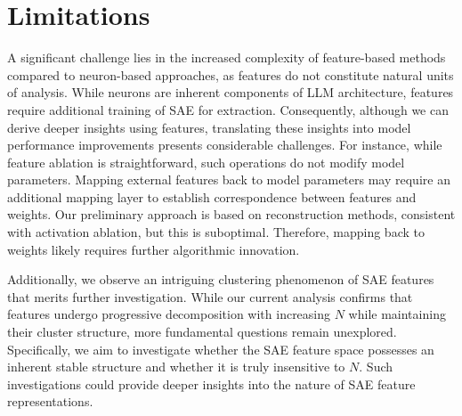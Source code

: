 \section{Limitations}
A significant challenge lies in the increased complexity of feature-based methods compared to neuron-based approaches, as features do not constitute natural units of analysis. While neurons are inherent components of LLM architecture, features require additional training of SAE for extraction. Consequently, although we can derive deeper insights using features, translating these insights into model performance improvements presents considerable challenges. For instance, while feature ablation is straightforward, such operations do not modify model parameters. Mapping external features back to model parameters may require an additional mapping layer to establish correspondence between features and weights. Our preliminary approach is based on reconstruction methods, consistent with activation ablation, but this is suboptimal. Therefore, mapping back to weights likely requires further algorithmic innovation.


Additionally, we observe an intriguing clustering phenomenon of SAE features that merits further investigation. While our current analysis confirms that features undergo progressive decomposition with increasing $N$ while maintaining their cluster structure, more fundamental questions remain unexplored. Specifically, we aim to investigate whether the SAE feature space possesses an inherent stable structure and whether it is truly insensitive to $N$. Such investigations could provide deeper insights into the nature of SAE feature representations.